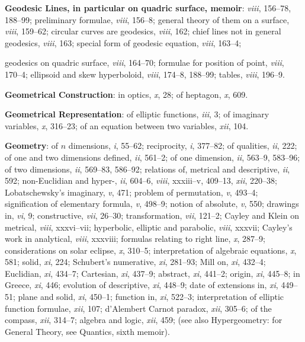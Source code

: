 \documentclass[11pt,a4paper]{article}
\newcommand{\IndexEntry}[1]{\textbf{#1}}
\newcommand{\V}[1]{\textit{#1}} %
\begin{document}
\IndexEntry{Geodesic Lines, in particular on quadric surface, memoir}: \V{viii}, 156--78, 188--99; preliminary formulae, \V{viii}, 156--8; general theory of them on a surface, \V{viii}, 159--62; circular curves are geodesics, \V{viii}, 162; chief lines not in general geodesics, \V{viii}, 163; special form of geodesic equation, \V{viii}, 163--4;

\newpage

\setcounter{page}{100}

\noindent geodesics on quadric surface, \V{viii}, 164--70; formulae for position of point, \V{viii}, 170--4; ellipsoid and skew hyperboloid, \V{viii}, 174--8, 188--99; tables, \V{viii}, 196--9.

\IndexEntry{Geometrical Construction}: in optics, \V{x}, 28; of heptagon, \V{x}, 609.

\IndexEntry{Geometrical Representation}: of elliptic functions, \V{iii}, 3; of imaginary variables, \V{x}, 316--23; of an equation between two variables, \V{xii}, 104.

\IndexEntry{Geometry}: of $n$ dimensions, \V{i}, 55--62; reciprocity, \V{i}, 377--82; of qualities, \V{ii}, 222; of one and two dimensions defined, \V{ii}, 561--2; of one dimension, \V{ii}, 563--9, 583--96; of two dimensions, \V{ii}, 569--83, 586--92; relations of, metrical and descriptive, \V{ii}, 592; non-Euclidian and hyper-, \V{ii}, 604--6, \V{viii}, xxxiii--v, 409--13, \V{xii}, 220--38; Lobatschewsky's imaginary, \V{v}, 471; problem of permutation, \V{v}, 493--4; signification of elementary formula, \V{v}, 498--9; notion of absolute, \V{v}, 550; drawings in, \V{vi}, 9; constructive, \V{vii}, 26--30; transformation, \V{vii}, 121--2; Cayley and Klein on metrical, \V{viii}, xxxvi--vii; hyperbolic, elliptic and parabolic, \V{viii}, xxxvii; Cayley's work in analytical, \V{viii}, xxxviii; formulas relating to right line, \V{x}, 287--9; considerations on solar eclipse, \V{x}, 310--5; interpretation of algebraic equations, \V{x}, 581; solid, \V{xi}, 224; Schubert's numerative, \V{xi}, 281--93; Mill on, \V{xi}, 432--4; Euclidian, \V{xi}, 434--7; Cartesian, \V{xi}, 437--9; abstract, \V{xi}, 441--2; origin, \V{xi}, 445--8; in Greece, \V{xi}, 446; evolution of descriptive, \V{xi}, 448--9; date of extensions in, \V{xi}, 449--51; plane and solid, \V{xi}, 450--1; function in, \V{xi}, 522--3; interpretation of elliptic function formulae, \V{xii}, 107; d'Alembert Carnot paradox, \V{xii}, 305--6; of the compass, \V{xii}, 314--7; algebra and logic, \V{xii}, 459; (see also Hypergeometry: for General Theory, see Quantics, sixth memoir).
\end{document}
